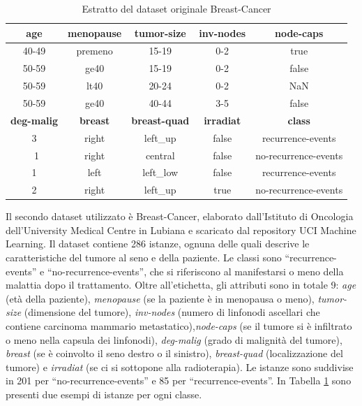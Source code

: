 \documentclass[11pt,  oneside, openany]{book}
\begin{document}
\begin{table} [h!]
    \centering 
    \begin{tabular}{|c|c|c|c|c|}
    \hline
        \textbf{age} & \textbf{menopause} & \textbf{tumor-size} & \textbf{inv-nodes} & \textbf{node-caps} \\ \hline

	40-49		& premeno		& 15-19		&0-2		&true		\\ 		
	50-59		& ge40		& 15-19		&0-2		&false		\\ 
	50-59		& lt40			& 20-24		&0-2		&NaN		\\ 	
	50-59		& ge40		& 40-44		&3-5		&false		\\ \hline \hline
 \textbf{deg-malig} & \textbf{breast} & \textbf{breast-quad} & \textbf{irradiat} & \textbf{class}\\ \hline 
3		&right		&left\_up	&false		&recurrence-events \\ \
1		&right		&central	&false		&no-recurrence-events \\ 
1		&left		&left\_low	&false		&recurrence-events \\ 
2		&right		&left\_up	&true		&no-recurrence-events \\ \hline		
   \end{tabular}
\caption{Estratto del dataset originale Breast-Cancer}
\label{table:4}
\end{table}

Il secondo dataset utilizzato è Breast-Cancer, elaborato dall'Istituto di Oncologia dell'University Medical Centre in Lubiana e scaricato dal repository UCI Machine Learning. Il dataset contiene 286 istanze, ognuna delle quali descrive le caratteristiche del tumore al seno e della paziente. Le classi sono ``recurrence-events'' e ``no-recurrence-events'', che si riferiscono al manifestarsi o meno della malattia dopo il trattamento. Oltre all'etichetta, gli attributi sono in totale 9: \textit{age} (età della paziente), \textit{menopause} (se la paziente è in menopausa o meno), \textit{tumor-size} (dimensione del tumore), \textit{inv-nodes} (numero di linfonodi ascellari che contiene carcinoma mammario metastatico),\textit{node-caps} (se il tumore si è infiltrato o meno nella capsula dei linfonodi), \textit{deg-malig} (grado di malignità del tumore), \textit{breast} (se è coinvolto il seno destro o il sinistro), \textit{breast-quad} (localizzazione del tumore) e \textit{irradiat} (se ci si sottopone alla radioterapia). Le istanze sono suddivise in 201 per ``no-recurrence-events'' e 85 per ``recurrence-events''. In Tabella \ref{table:4} sono presenti due esempi di istanze per ogni classe. 
\end{document}
